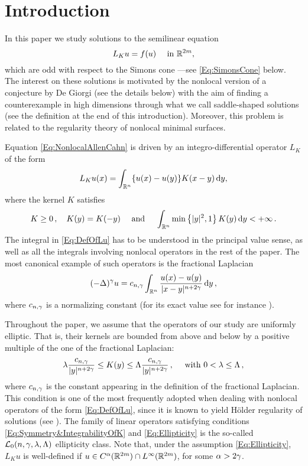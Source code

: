 \section{Introduction}
\label{Sec:Introduction}


In this paper we study solutions to the semilinear equation
\begin{equation}
\label{Eq:NonlocalAllenCahn}
L_K u = f(u) \quad \textrm{ in } \mathbb{R}^{2m},
\end{equation}
which are odd with respect to the Simons cone ---see \eqref{Eq:SimonsCone} below. The interest on these solutions is motivated by the nonlocal version of a conjecture by De Giorgi (see the details below) with the aim of finding a counterexample in high dimensions through what we call saddle-shaped solutions (see the definition at the end of this introduction). Moreover, this problem is related to the regularity theory of nonlocal minimal surfaces.

Equation \eqref{Eq:NonlocalAllenCahn} is driven by an integro-differential operator $L_K$ of the form
\begin{equation}
\label{Eq:DefOfLu}
L_Ku(x) = \int_{\mathbb{R}^n} \{u(x) - u(y)\} K(x-y)\,\mathrm{d} y,
\end{equation}
where the kernel $K$ satisfies
\begin{equation}
\label{Eq:Symmetry&IntegrabilityOfK}
K\geq 0\,, \quad K(y) = K(-y) \quad \textrm{ and } \quad \int_{\mathbb{R}^n} \min \left\{ |y|^2, 1 \right\} K(y) \,\mathrm{d} y < + \infty\,.
\end{equation}
The integral in \eqref{Eq:DefOfLu} has to be understood in the principal value sense, as well as all the integrals involving nonlocal operators in the rest of the paper.
The most canonical example of such operators is the fractional Laplacian
$$
(-\Delta)^\gamma u = c_{n, \gamma} \int_{\mathbb{R}^n} \dfrac{u(x) - u(y)}{|x-y|^{n + 2\gamma}}\,\mathrm{d} y\,,
$$
where $c_{n, \gamma}$ is a normalizing constant (for its exact value see for instance \cite{HitchhikerGuide}).

Throughout the paper, we assume that the operators of our study are uniformly elliptic. That is, their kernels are bounded from above and below by a positive multiple of the one of the fractional Laplacian:
\begin{equation}
\label{Eq:Ellipticity}
\lambda \dfrac{c_{n,\gamma}}{|y|^{n+2\gamma}} \leq K(y) \leq \Lambda\dfrac{c_{n,\gamma}}{|y|^{n+2\gamma}}\,, \quad \text{ with }  0< \lambda \leq \Lambda \,,
\end{equation}
where $c_{n,\gamma}$ is the constant appearing in the definition of the fractional Laplacian. This condition is one of the most frequently adopted when dealing with nonlocal operators of the form \eqref{Eq:DefOfLu}, since it is known to yield Hölder regularity of solutions (see \cite{RosOton-Survey,SerraC2s+alphaRegularity}). The family of linear operators satisfying conditions \eqref{Eq:Symmetry&IntegrabilityOfK} and \eqref{Eq:Ellipticity} is the so-called $\mathcal{L}_0(n,\gamma,\lambda, \Lambda)$ ellipticity class. Note that, under the assumption \eqref{Eq:Ellipticity}, $L_K u$ is well-defined if $u\in C^\alpha(\mathbb{R}^{2m})\cap L^\infty(\mathbb{R}^{2m})$, for some $\alpha > 2 \gamma$.


